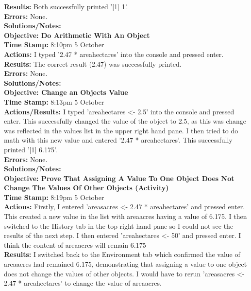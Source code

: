 \documentclass{article}
\begin{document}
\begin{FlushLeft}
\textbf{Results:} Both successfully printed '[1] 1'.\\
\textbf{Errors:} None.\\
\textbf{Solutions/Notes:}\\
\vspace{5mm}
\textbf{Objective: Do Arithmetic With An Object}\\ 
\textbf{Time Stamp:} 8:10pm 5 October\\
\textbf{Actions:} I typed '2.47 * area\textunderscore hectares' into the console and pressed enter.\\
\textbf{Results:} The correct result (2.47) was successfully printed.\\
\textbf{Errors:} None.\\
\textbf{Solutions/Notes:}\\
\textbf{Objective: Change an Objects Value}\\ 
\textbf{Time Stamp:} 8:13pm 5 October\\
\textbf{Actions/Results:} I typed 'area\textunderscore hectares \textless - 2.5' into the console and pressed enter. This successfully changed the value of the object to 2.5, as this was change was reflected in the values list in the upper right hand pane. I then tried to do math with this new value and entered '2.47 * area\textunderscore hectares'. This successfully printed '[1] 6.175'. \\
\textbf{Errors:} None.\\
\textbf{Solutions/Notes:}\\
\vspace{5mm}
\textbf{Objective: Prove That Assigning A Value To One Object Does Not Change The Values Of Other Objects (Activity)}\\ 
\textbf{Time Stamp:} 8:19pm 5 October\\
\textbf{Actions:} Firstly, I entered 'areas\textunderscore acres \textless - 2.47 * area\textunderscore hectares' and pressed enter. This created a new value in the list with area\textunderscore acres having a value of 6.175. I then switched to the History tab in the top right hand pane so I could not see the results of the next step. I then entered 'area\textunderscore hectares \textless - 50' and pressed enter. I think the content of area\textunderscore acres will remain 6.175\\
\textbf{Results:} I switched back to the Environment tab which confirmed the value of area\textunderscore acres had remained 6.175, demonstrating that assigning a value to one object does not change the values of other objects. I would have to rerun 'areas\textunderscore acres \textless - 2.47 * area\textunderscore hectares' to change the value of area\textunderscore acres.\\

\end{FlushLeft}
\end{document}
